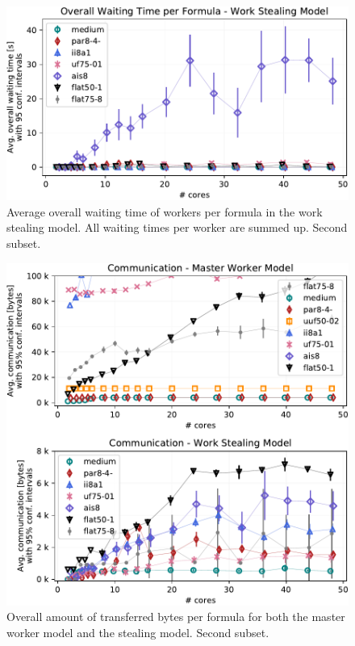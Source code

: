 \documentclass[letterpaper]{article}
\begin{document}
\begin{figure}[p]
    \centering
    \includegraphics[width=\columnwidth]{figures/waiting_stealing_non_subset_dpll_scaling_tar.pdf}
    \caption{Average overall waiting time of workers per formula in the work stealing model.
    All waiting times per worker are summed up.
    Second subset.}
    \label{fig:dpll_stealing_waiting_non}
\end{figure}

\begin{figure}[p]
    \centering
    \includegraphics[width=\columnwidth]{figures/comm_non_subset_dpll_scaling_tar.pdf}
    \caption{Overall amount of transferred bytes per formula for both the master worker model and the stealing model.
    Second subset.}
    \label{fig:comm_reduce_non}
\end{figure}
\end{document}
